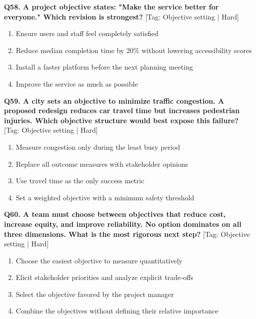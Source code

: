 \noindent\textbf{Q58. A project objective states: "Make the service better for everyone." Which revision is strongest?} \hfill [Tag: Objective setting | Hard]
\begin{enumerate}[label=(\alph*),topsep=2pt,itemsep=1pt,partopsep=0pt,parsep=0pt]
    \item {Ensure users and staff feel completely satisfied}
    \item {Reduce median completion time by 20\% without lowering accessibility scores}
    \item {Install a faster platform before the next planning meeting}
    \item {Improve the service as much as possible}
\end{enumerate}
\vspace{2mm}

\noindent\textbf{Q59. A city sets an objective to minimize traffic congestion. A proposed redesign reduces car travel time but increases pedestrian injuries. Which objective structure would best expose this failure?} \hfill [Tag: Objective setting | Hard]
\begin{enumerate}[label=(\alph*),topsep=2pt,itemsep=1pt,partopsep=0pt,parsep=0pt]
    \item {Measure congestion only during the least busy period}
    \item {Replace all outcome measures with stakeholder opinions}
    \item {Use travel time as the only success metric}
    \item {Set a weighted objective with a minimum safety threshold}
\end{enumerate}
\vspace{2mm}

\noindent\textbf{Q60. A team must choose between objectives that reduce cost, increase equity, and improve reliability. No option dominates on all three dimensions. What is the most rigorous next step?} \hfill [Tag: Objective setting | Hard]
\begin{enumerate}[label=(\alph*),topsep=2pt,itemsep=1pt,partopsep=0pt,parsep=0pt]
    \item {Choose the easiest objective to measure quantitatively}
    \item {Elicit stakeholder priorities and analyze explicit trade-offs}
    \item {Select the objective favored by the project manager}
    \item {Combine the objectives without defining their relative importance}
\end{enumerate}
\vspace{2mm}


